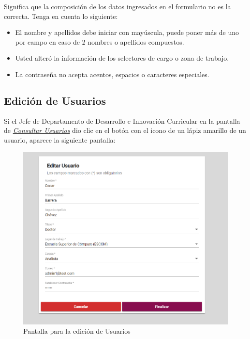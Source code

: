 \begin{itemize}
\begin{figure}[H]
                        \end{figure}

                        Significa que la composición de los datos ingresados en el formulario no es la correcta. Tenga en cuenta lo siguiente:

                        \begin{itemize}
                            \item El nombre y apellidos debe iniciar con mayúscula, puede poner más de uno por campo en caso de 2 nombres o apellidos compuestos.
                            \item Usted alteró la información de los selectores de cargo o zona de trabajo.
                            \item La contraseña no acepta acentos, espacios o caracteres especiales.
                        \end{itemize}

                \end{itemize}

\newpage

            \hypertarget{editar-user}{}
            \subsection{Edición de Usuarios}
                Si el Jefe de Departamento de Desarrollo e Innovación Curricular en la pantalla de \hyperlink{consultarUs}{\textit{Consultar Usuarios}} dio clic en el botón con el icono de un lápiz amarillo de un usuario, aparece la siguiente pantalla:

                \begin{figure}[H]
                    \centering
                    \hypertarget{editarUs}{\includegraphics[width=0.6\linewidth]{images/SP5/Editar-Usuario}}
                    \caption{Pantalla para la edición de Usuarios}
                    \label{editarrh}
                \end{figure}


